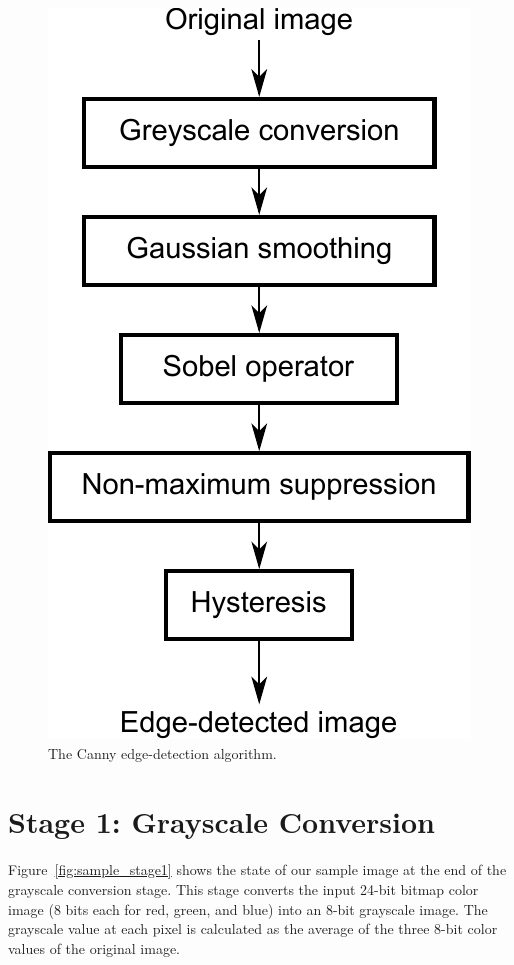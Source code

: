 \documentclass[epsfig,10pt,fullpage]{article}
\begin{document}
\pagebreak
\begin{figure}[H]
   \begin{center}
       \includegraphics[scale = 0.6]{figures/canny.pdf}
   \end{center}
	\caption{The Canny edge-detection algorithm.}
	\label{fig:canny}
\end{figure}

\noindent
\section*{Stage 1: Grayscale Conversion}

Figure~\ref{fig:sample_stage1} shows the state of our sample image at the end of the grayscale 
conversion stage. This stage converts the input 24-bit bitmap color image (8 bits each for red, 
green, and blue) into an 8-bit grayscale image. The grayscale value at each pixel is calculated 
as the average of the three 8-bit color values of the original image.
\end{document}
